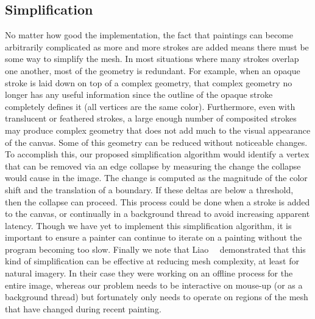 \documentclass[conference]{acmsiggraph}
\begin{document}
\subsection{Simplification}
\label{sec:simplify}
No matter how good the implementation, the fact that paintings can become arbitrarily complicated as more and more strokes are added
means there must be some way to simplify the mesh. In most situations where
many strokes overlap one another, most of the geometry is redundant. For example, when an opaque stroke is laid down on top of a complex geometry, that complex
geometry no longer has any useful information since the outline of the opaque stroke
completely defines it (all vertices are the same color).  Furthermore, even with translucent or feathered strokes, a large enough number of 
composited strokes may produce complex geometry that does not add much to the visual appearance of the canvas. Some of this geometry can be reduced without noticeable changes.  To accomplish this, our proposed simplification algorithm would identify a vertex that can be removed via an edge collapse by measuring the change the collapse would cause in the image.  The change is computed as the magnitude of the color shift and the translation of a boundary.  If these deltas are below a threshold, then the collapse can proceed.  This process could be done when a stroke is added to the canvas, or continually in a background thread to avoid increasing apparent latency.  Though we have yet to implement this simplification algorithm, it is important to ensure a painter can continue to iterate on a painting without the program becoming too slow.
%
Finally we note that Liao~\etal~ demonstrated that this kind of simplification can be effective at reducing mesh complexity, at least for natural imagery.
%
In their case they were working on an offline process for the entire image, whereas our
problem needs to be interactive on mouse-up (or as a background thread) but fortunately
only needs to operate on regions of the mesh that have changed during recent painting.
\end{document}
